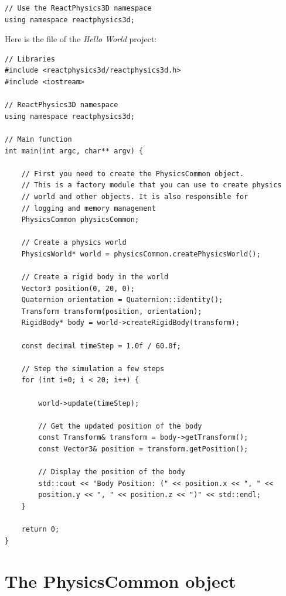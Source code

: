 \documentclass[a4paper,12pt]{article}
\begin{document}
    \begin{lstlisting}
// Use the ReactPhysics3D namespace
using namespace reactphysics3d;
    \end{lstlisting}

    \vspace{0.6cm}

    Here is the  file of the \emph{Hello World} project: \\

    \begin{lstlisting}
// Libraries
#include <reactphysics3d/reactphysics3d.h>
#include <iostream>

// ReactPhysics3D namespace
using namespace reactphysics3d;

// Main function
int main(int argc, char** argv) {

    // First you need to create the PhysicsCommon object.
    // This is a factory module that you can use to create physics
    // world and other objects. It is also responsible for
    // logging and memory management
    PhysicsCommon physicsCommon;

    // Create a physics world
    PhysicsWorld* world = physicsCommon.createPhysicsWorld();

    // Create a rigid body in the world
    Vector3 position(0, 20, 0);
    Quaternion orientation = Quaternion::identity();
    Transform transform(position, orientation);
    RigidBody* body = world->createRigidBody(transform);

    const decimal timeStep = 1.0f / 60.0f;

    // Step the simulation a few steps
    for (int i=0; i < 20; i++) {

        world->update(timeStep);

        // Get the updated position of the body
        const Transform& transform = body->getTransform();
        const Vector3& position = transform.getPosition();

        // Display the position of the body
        std::cout << "Body Position: (" << position.x << ", " <<
	    position.y << ", " << position.z << ")" << std::endl;
    }

    return 0;
}
    \end{lstlisting}
   
   \section{The PhysicsCommon object}
     \label{sec:physicscommon}
\end{document}
